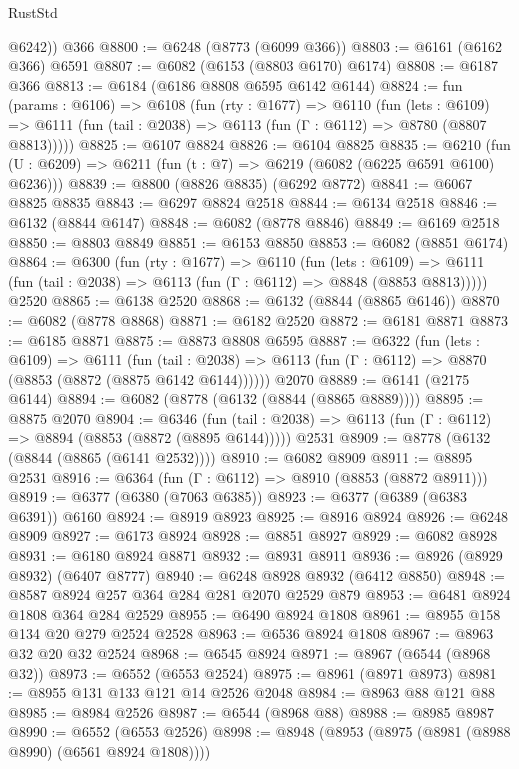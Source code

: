\begin{lexlean}{RustStd}
\begin{coremodule}
        @6242))
    @366
@8800 := @6248 (@8773 (@6099 @366))
@8803 := @6161 (@6162 @366) @6591
@8807 := @6082 (@6153 (@8803 @6170) @6174)
@8808 := @6187 @366
@8813 := @6184 (@6186 @8808 @6595 @6142 @6144)
@8824 := fun (params : @6106) =>
  @6108
    (fun (rty : @1677) =>
    @6110
      (fun (lets : @6109) =>
      @6111 (fun (tail : @2038) => @6113 (fun (Γ : @6112) => @8780 (@8807 @8813)))))
@8825 := @6107 @8824
@8826 := @6104 @8825
@8835 := @6210 (fun (U : @6209) => @6211 (fun (t : @7) => @6219 (@6082 (@6225 @6591 @6100) @6236)))
@8839 := @8800 (@8826 @8835) (@6292 @8772)
@8841 := @6067 @8825 @8835
@8843 := @6297 @8824 @2518
@8844 := @6134 @2518
@8846 := @6132 (@8844 @6147)
@8848 := @6082 (@8778 @8846)
@8849 := @6169 @2518
@8850 := @8803 @8849
@8851 := @6153 @8850
@8853 := @6082 (@8851 @6174)
@8864 := @6300
    (fun (rty : @1677) =>
    @6110
      (fun (lets : @6109) =>
      @6111 (fun (tail : @2038) => @6113 (fun (Γ : @6112) => @8848 (@8853 @8813)))))
    @2520
@8865 := @6138 @2520
@8868 := @6132 (@8844 (@8865 @6146))
@8870 := @6082 (@8778 @8868)
@8871 := @6182 @2520
@8872 := @6181 @8871
@8873 := @6185 @8871
@8875 := @8873 @8808 @6595
@8887 := @6322
    (fun (lets : @6109) =>
    @6111
      (fun (tail : @2038) => @6113 (fun (Γ : @6112) => @8870 (@8853 (@8872 (@8875 @6142 @6144))))))
    @2070
@8889 := @6141 (@2175 @6144)
@8894 := @6082 (@8778 (@6132 (@8844 (@8865 @8889))))
@8895 := @8875 @2070
@8904 := @6346
    (fun (tail : @2038) => @6113 (fun (Γ : @6112) => @8894 (@8853 (@8872 (@8895 @6144)))))
    @2531
@8909 := @8778 (@6132 (@8844 (@8865 (@6141 @2532))))
@8910 := @6082 @8909
@8911 := @8895 @2531
@8916 := @6364 (fun (Γ : @6112) => @8910 (@8853 (@8872 @8911)))
@8919 := @6377 (@6380 (@7063 @6385))
@8923 := @6377 (@6389 (@6383 @6391)) @6160
@8924 := @8919 @8923
@8925 := @8916 @8924
@8926 := @6248 @8909
@8927 := @6173 @8924
@8928 := @8851 @8927
@8929 := @6082 @8928
@8931 := @6180 @8924 @8871
@8932 := @8931 @8911
@8936 := @8926 (@8929 @8932) (@6407 @8777)
@8940 := @6248 @8928 @8932 (@6412 @8850)
@8948 := @8587 @8924 @257 @364 @284 @281 @2070 @2529 @879
@8953 := @6481 @8924 @1808 @364 @284 @2529
@8955 := @6490 @8924 @1808
@8961 := @8955 @158 @134 @20 @279 @2524 @2528
@8963 := @6536 @8924 @1808
@8967 := @8963 @32 @20 @32 @2524
@8968 := @6545 @8924
@8971 := @8967 (@6544 (@8968 @32))
@8973 := @6552 (@6553 @2524)
@8975 := @8961 (@8971 @8973)
@8981 := @8955 @131 @133 @121 @14 @2526 @2048
@8984 := @8963 @88 @121 @88
@8985 := @8984 @2526
@8987 := @6544 (@8968 @88)
@8988 := @8985 @8987
@8990 := @6552 (@6553 @2526)
@8998 := @8948 (@8953 (@8975 (@8981 (@8988 @8990) (@6561 @8924 @1808))))

\end{coremodule}
\end{lexlean}
